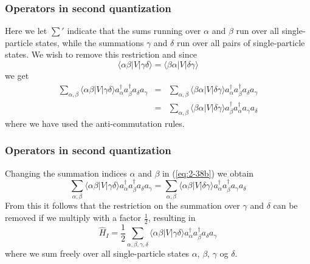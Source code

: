\documentclass[compress]{beamer}
\newcommand*{\ket}[1]{|#1\rangle}
\newcommand*{\bra}[1]{\langle#1|}
\newcommand{\element}[3]
        {\bra{#1}#2\ket{#3}}
\begin{document}
\frame
{
  \frametitle{Operators in second quantization}
\begin{small}
{\scriptsize
Here we let $\sum'$ indicate that the sums running over $\alpha$ and $\beta$ run over all
single-particle states, while the summations  $\gamma$ and $\delta$ 
run over all pairs of single-particle states. We wish to remove this restriction and since
\begin{equation}
	\element{\alpha\beta}{V}{\gamma\delta} = \element{\beta\alpha}{V}{\delta\gamma} \label{eq:2-37}
\end{equation}
we get
\begin{eqnarray}
	\sum_{\alpha, \beta} \element{\alpha\beta}{V}{\gamma\delta} a^\dagger_\alpha a^\dagger_\beta a_\delta a_\gamma &=& 
		\sum_{\alpha, \beta} \element{\beta\alpha}{V}{\delta\gamma} 
		a^\dagger_\alpha a^\dagger_\beta a_\delta a_\gamma \label{eq:2-38a} \\
	&=& \sum_{\alpha, \beta}\element{\beta\alpha}{V}{\delta\gamma} 
		a^\dagger_\beta a^\dagger_\alpha a_\gamma a_\delta \label{eq:2-38b}
\end{eqnarray}
where we  have used the anti-commutation rules.
}
\end{small}
}



\frame
{
  \frametitle{Operators in second quantization}
\begin{small}
{\scriptsize
Changing the summation indices 
$\alpha$ and $\beta$ in (\ref{eq:2-38b}) we obtain
\begin{equation}
	\sum_{\alpha, \beta} \element{\alpha\beta}{V}{\gamma\delta} a^\dagger_\alpha a^\dagger_\beta a_\delta a_\gamma =
		 \sum_{\alpha, \beta} \element{\alpha\beta}{V}{\delta\gamma} 
		  a^\dagger_\alpha a^\dagger_\beta  a_\gamma a_\delta \label{eq:2-38c}
\end{equation}
From this it follows that the restriction on the summation over $\gamma$ and $\delta$ can be removed if we multiply with a factor $\frac{1}{2}$, resulting in 
\begin{equation}
	\hat{H}_I = \frac{1}{2} \sum_{\alpha, \beta, \gamma, \delta} \element{\alpha\beta}{V}{\gamma\delta}
		a^\dagger_\alpha a^\dagger_\beta a_\delta a_\gamma \label{eq:2-39}
\end{equation}
where we sum freely over all single-particle states $\alpha$, 
$\beta$, $\gamma$ og $\delta$.
}
\end{small}
}
\end{document}
